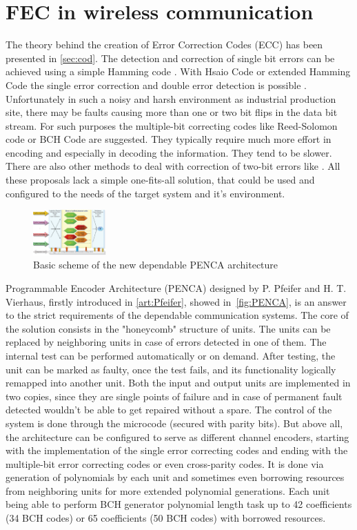 \section{FEC in wireless communication}\label{sec:PENCA}
The theory behind the creation of Error Correction Codes (ECC) has been presented in \autoref{sec:cod}. The detection and correction of single bit errors can be achieved using a simple Hamming code \cite{art:Hamming}. With Hsaio Code or extended Hamming Code the single error correction and double error detection is possible \cite{book:Fujiwara,art:Hsiao}. Unfortunately in such a noisy and harsh environment as industrial production site, there may be faults causing more than one or two bit flips in the data bit stream. For such purposes the multiple-bit correcting codes like Reed-Solomon code \cite{Redd-Solomon} or BCH Code \cite{BCH} are suggested. They typically require much more effort in  encoding and especially in decoding the information. They tend to be slower. There are also other methods to deal with correction of two-bit errors like \cite{Hosp, Varghese}. All these proposals lack a simple one-fits-all solution, that could be used and configured to the needs of the target system and it's environment.

\begin{figure}[h]
\centering
\includegraphics[width=0.25\textwidth]{figures/PENCA.png}
\caption{Basic scheme of the new dependable PENCA architecture~\cite{art:Pfeifer}}
\label{fig:PENCA}
\end{figure}

Programmable Encoder Architecture (PENCA) designed by P. Pfeifer and H. T. Vierhaus, firstly introduced in \ref{art:Pfeifer}, showed in~\autoref{fig:PENCA}, is an answer to the strict requirements of the dependable communication systems. The core of the solution consists in the "honeycomb" structure of units. The units can be replaced by neighboring units in case of errors detected in one of them. The internal test can be performed automatically or on demand. After testing, the unit can be marked as faulty, once the test fails, and its functionality logically remapped into another unit. Both the input and output units are implemented in two copies, since they are single points of failure and in case of permanent fault detected wouldn't be able to get repaired without a spare. The control of the system is done through the microcode (secured with parity bits). But above all, the architecture can be configured to serve as different channel encoders, starting with the implementation of the single error correcting codes and ending with the multiple-bit error correcting codes or even cross-parity codes. It is done via generation of polynomials by each unit and sometimes even borrowing resources from neighboring units for more extended polynomial generations. Each unit being able to perform BCH generator polynomial length task up to 42 coefficients (34 BCH codes) or 65 coefficients (50 BCH codes) with borrowed resources.
